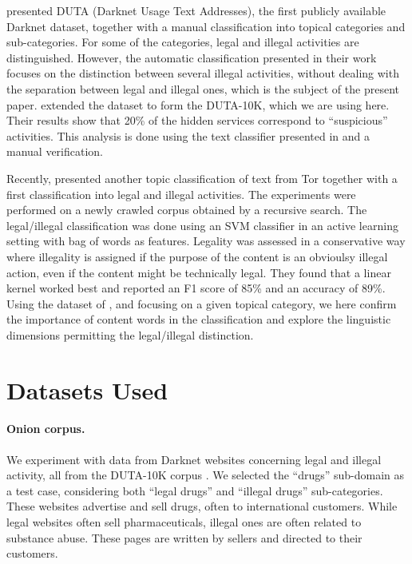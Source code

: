 \documentclass[11pt,a4paper,table]{article}
\newcommand{\oa}[1]{\footnote{\color{red}OA: #1}}
\begin{document}
\citet{AlNabki17} presented DUTA (Darknet Usage Text Addresses), the first publicly available Darknet dataset, together with a manual classification into topical categories and sub-categories. For some of the categories, legal and illegal activities are distinguished. However, the automatic classification presented in their work focuses on the distinction between several illegal activities, without dealing with the separation between legal and illegal ones, which is the subject of the present paper. \citet{AlNabki19} extended the dataset to form the DUTA-10K, which we are using here. Their results show that 20\% of the hidden services correspond to ``suspicious'' activities. This analysis is done using the text classifier presented in \citet{AlNabki17} and a manual verification. %

Recently, \citet{Avarikioti18} presented another topic classification of text from Tor together with a first classification into legal and illegal activities.  The experiments were performed on a newly crawled corpus obtained by a recursive search. The legal/illegal classification was done using an SVM classifier in an active learning setting with bag of words as features. Legality was assessed in a conservative way where illegality is assigned if the purpose of the content is an obvioulsy illegal action, even if the content might be technically legal. They found that a linear kernel worked best and reported an F1 score of 85\% and an accuracy of 89\%. Using the dataset of \citet{AlNabki19}, and focusing on a given topical category, we here confirm the importance of content words in the classification and explore the linguistic dimensions permitting the legal/illegal distinction. 




\section{Datasets Used}\label{sec:datasets}

\paragraph{Onion corpus.}
We experiment with data from Darknet websites concerning
legal and illegal activity, all from the DUTA-10K corpus \citep{AlNabki19}.
We selected the ``drugs'' sub-domain as a test case, considering both ``legal drugs'' and ``illegal drugs'' sub-categories.
These websites advertise and sell
drugs, often to international customers.
While legal websites often sell pharmaceuticals,
illegal ones are often related to substance abuse.
These pages are written by sellers and directed to their customers.
  
\end{document}
